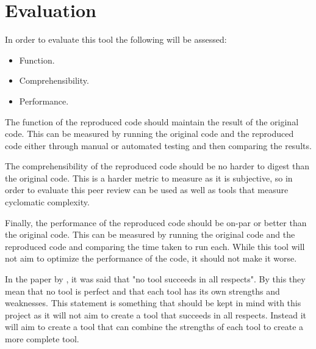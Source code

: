 \section{Evaluation}

In order to evaluate this tool the following will be assessed:
\begin{itemize}
	\item Function.
	\item Comprehensibility.
	\item Performance.
\end{itemize}
The function of the reproduced code should maintain the result of the original code. This can be measured by running the original code and the reproduced code either through manual or automated testing and then comparing the results.

The comprehensibility of the reproduced code should be no harder to digest than the original code. This is a harder metric to measure as it is subjective, so in order to evaluate this peer review can be used as well as tools that measure cyclomatic complexity.

Finally, the performance of the reproduced code should be on-par or better than the original code. This can be measured by running the original code and the reproduced code and comparing the time taken to run each. While this tool will not aim to optimize the performance of the code, it should not make it worse.

In the paper by \cite{8681007}, it was said that "no tool succeeds in all respects". By this they mean that no tool is perfect and that each tool has its own strengths and weaknesses. This statement is something that should be kept in mind with this project as it will not aim to create a tool that succeeds in all respects. Instead it will aim to create a tool that can combine the strengths of each tool to create a more complete tool.